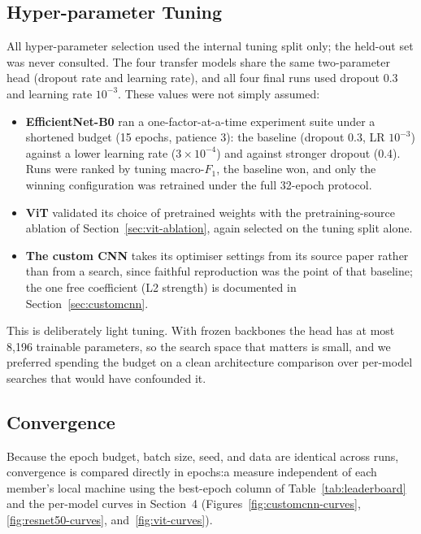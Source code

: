 \documentclass[11pt,twoside,a4paper]{article}
\begin{document}
\subsection{Hyper-parameter Tuning}

All hyper-parameter selection used the internal tuning split only; the
held-out set was never consulted. The four transfer models share the same
two-parameter head (dropout rate and learning rate), and all four final runs
used dropout $0.3$ and learning rate $10^{-3}$. These values were not simply
assumed:

\begin{itemize}
  \item \textbf{EfficientNet-B0} ran a one-factor-at-a-time experiment suite
    under a shortened budget (15 epochs, patience 3): the baseline
    (dropout 0.3, LR $10^{-3}$) against a lower learning rate
    ($3 \times 10^{-4}$) and against stronger dropout (0.4). Runs were ranked
    by tuning macro-$F_1$, the baseline won, and only the winning
    configuration was retrained under the full 32-epoch protocol.
  \item \textbf{ViT} validated its choice of pretrained weights with the
    pretraining-source ablation of Section~\ref{sec:vit-ablation}, again
    selected on the tuning split alone.
  \item \textbf{The custom CNN} takes its optimiser settings from its source
    paper rather than from a search, since faithful reproduction was the point
    of that baseline; the one free coefficient (L2 strength) is documented in
    Section~\ref{sec:customcnn}.
\end{itemize}

This is deliberately light tuning. With frozen backbones the head has at most
8,196 trainable parameters, so the search space that matters is small, and we
preferred spending the budget on a clean architecture comparison over
per-model searches that would have confounded it.

\subsection{Convergence}

Because the epoch budget, batch size, seed, and data are identical across
runs, convergence is compared directly in epochs:a measure independent of
each member's local machine using the best-epoch column of
Table~\ref{tab:leaderboard} and the per-model curves in Section~4
(Figures~\ref{fig:customcnn-curves}, \ref{fig:resnet50-curves},
and~\ref{fig:vit-curves}).
\end{document}
